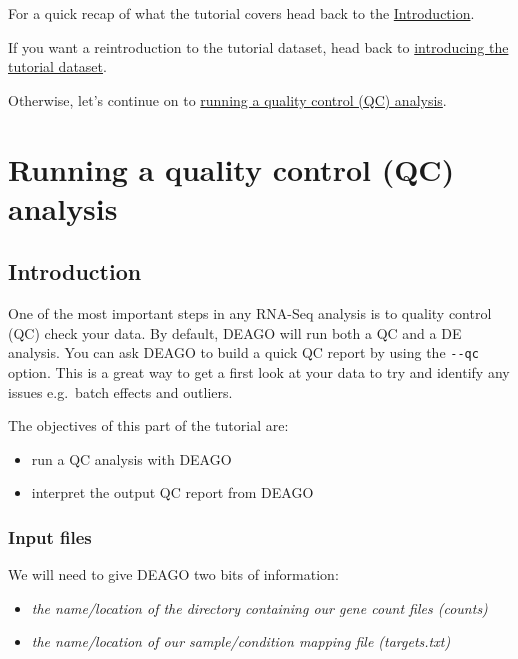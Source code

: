 \documentclass[11pt]{article}
\providecommand{\tightlist}{%
      \setlength{\itemsep}{0pt}\setlength{\parskip}{0pt}}
\begin{document}
For a quick recap of what the tutorial covers head back to the
\href{index.ipynb}{Introduction}.

If you want a reintroduction to the tutorial dataset, head back to
\href{introduction.ipynb}{introducing the tutorial dataset}.

Otherwise, let's continue on to \href{quality-control.ipynb}{running a
quality control (QC) analysis}.





\newpage






    \hypertarget{running-a-quality-control-qc-analysis}{%
\section{Running a quality control (QC)
analysis}\label{running-a-quality-control-qc-analysis}}

    \hypertarget{introduction}{%
\subsection{Introduction}\label{introduction}}

One of the most important steps in any RNA-Seq analysis is to quality
control (QC) check your data. By default, DEAGO will run both a QC and a
DE analysis. You can ask DEAGO to build a quick QC report by using the
\texttt{-\/-qc} option. This is a great way to get a first look at your
data to try and identify any issues e.g.~batch effects and outliers.

The objectives of this part of the tutorial are:

\begin{itemize}
\tightlist
\item
  run a QC analysis with DEAGO
\item
  interpret the output QC report from DEAGO
\end{itemize}

\hypertarget{input-files}{%
\subsubsection{Input files}\label{input-files}}

We will need to give DEAGO two bits of information:

\begin{itemize}
\item
  \textit{the name/location of the directory containing our gene count
  files (counts)}
\item
  \textit{the name/location of our sample/condition mapping file
  (targets.txt)}
\end{itemize}
\end{document}
